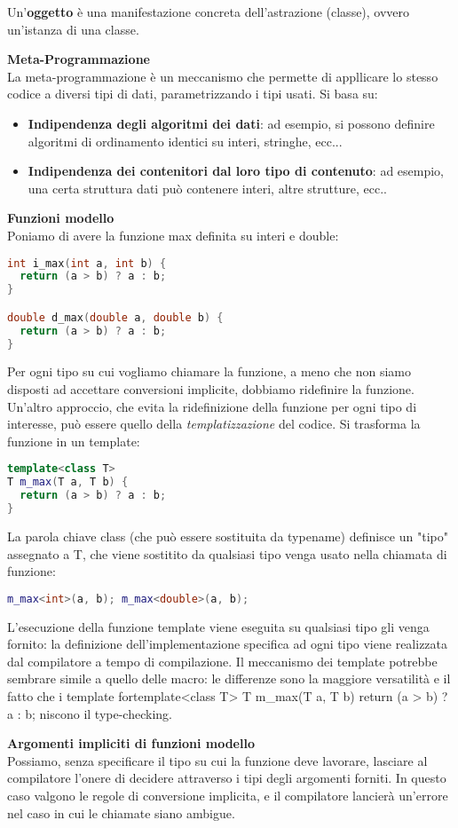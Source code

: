 \documentclass[a4paper,12pt]{article}
\begin{document}
Un'\textbf{oggetto} è una manifestazione concreta dell'astrazione (classe), ovvero un'istanza di una classe.
\par\smallskip
\textbf{Meta-Programmazione} \\
La meta-programmazione è un meccanismo che permette di appllicare lo stesso codice a diversi tipi di dati, parametrizzando i tipi usati. Si basa su:
\begin{itemize}
  \item \textbf{Indipendenza degli algoritmi dei dati}: ad esempio, si possono definire algoritmi di ordinamento identici su interi, stringhe, ecc...
  \item \textbf{Indipendenza dei contenitori dal loro tipo di contenuto}: ad esempio, una certa struttura dati può contenere interi, altre strutture, ecc..
\end{itemize}
\par\smallskip
\textbf{Funzioni modello} \\
Poniamo di avere la funzione max definita su interi e double:
\begin{lstlisting}[language=C++]
int i_max(int a, int b) {
  return (a > b) ? a : b;
}

double d_max(double a, double b) {
  return (a > b) ? a : b;
}
\end{lstlisting}
Per ogni tipo su cui vogliamo chiamare la funzione, a meno che non siamo disposti ad accettare conversioni implicite, dobbiamo ridefinire la funzione.
Un'altro approccio, che evita la ridefinizione della funzione per ogni tipo di interesse, può essere quello della \textit{templatizzazione} del codice.
Si trasforma la funzione in un template:
\begin{lstlisting}[language=C++]
template<class T>
T m_max(T a, T b) {
  return (a > b) ? a : b;
}
\end{lstlisting}
La parola chiave class (che può essere sostituita da typename) definisce un "tipo" assegnato a T, che viene sostitito da qualsiasi tipo venga usato
nella chiamata di funzione:
\begin{lstlisting}[language=C++]
m_max<int>(a, b); m_max<double>(a, b);
\end{lstlisting}
L'esecuzione della funzione template viene eseguita su qualsiasi tipo gli venga fornito: la definizione dell'implementazione specifica ad ogni tipo
viene realizzata dal compilatore a tempo di compilazione. Il meccanismo dei template potrebbe sembrare simile a quello delle macro: le differenze sono
la maggiore versatilità e il fatto che i template fortemplate<class T>
T m_max(T a, T b) {
  return (a > b) ? a : b;
}niscono il type-checking.
\par\smallskip
\textbf{Argomenti impliciti di funzioni modello} \\
Possiamo, senza specificare il tipo su cui la funzione deve lavorare, lasciare al compilatore l'onere di decidere attraverso i tipi degli argomenti forniti. In questo
caso valgono le regole di conversione implicita, e il compilatore lancierà un'errore nel caso in cui le chiamate siano ambigue.
\end{document}
